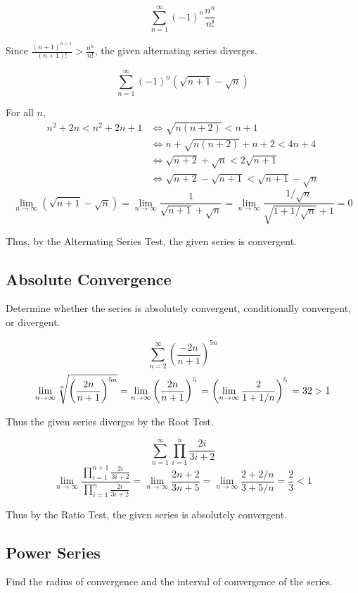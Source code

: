 \documentclass[a4paper,12pt]{article}
\begin{document}
\[\sum_{n=1}^\infty (-1)^n\frac{n^n}{n!}\tag{19}\]

Since $\frac{(n + 1)^{n + 1}}{(n + 1)!} > \frac{n^n}{n!}$, the given
alternating series diverges.

\[\sum_{n=1}^\infty (-1)^n\left(\sqrt{n + 1} - \sqrt n\right)\tag{20}\]

For all $n$,
\begin{align*}
      n^2 + 2n < n^2 + 2n + 1
&\iff \sqrt{n(n + 2)} < n + 1\\
&\iff n + \sqrt{n(n + 2)} + n + 2 < 4n + 4\\
&\iff \sqrt{n + 2} + \sqrt n < 2\sqrt{n + 1}\\
&\iff \sqrt{n + 2} - \sqrt{n + 1} < \sqrt{n + 1} - \sqrt n\tag{i}
\end{align*}
\[\lim_{n\to\infty}\left(\sqrt{n + 1} - \sqrt n\right)
= \lim_{n\to\infty}\frac{1}{\sqrt{n + 1} + \sqrt n}
= \lim_{n\to\infty}\frac{1/\sqrt n}{\sqrt{1 + 1/\sqrt{n}} + 1}
= 0\tag{ii}\]

Thus, by the Alternating Series Test, the given series is convergent.

\subsection{Absolute Convergence}
Determine whether the series is absolutely convergent,
conditionally convergent, or divergent.

\[\sum_{n=2}^\infty\left(\frac{-2n}{n + 1}\right)^{5n}\tag{22}\]
\[\lim_{n\to\infty}\sqrt[n]{\left(\frac{2n}{n + 1}\right)^{5n}}
= \lim_{n\to\infty}\left(\frac{2n}{n + 1}\right)^5\\
= \left(\lim_{n\to\infty}\frac{2}{1 + 1/n}\right)^5\\
= 32 > 1\]

Thus the given series diverges by the Root Test.

\[\sum_{n=1}^\infty\prod_{i=1}^n\frac{2i}{3i + 2}\tag{30}\]
\[\lim_{n\to\infty}\frac{\prod_{i=1}^{n+1}\frac{2i}{3i + 2}}
                        {\prod_{i=1}^n\frac{2i}{3i + 2}}
= \lim_{n\to\infty}\frac{2n + 2}{3n + 5}
= \lim_{n\to\infty}\frac{2 + 2/n}{3 + 5/n}
= \frac{2}{3} < 1\]

Thus by the Ratio Test, the given series is absolutely convergent.

\setcounter{subsection}{7}
\subsection{Power Series}
Find the radius of convergence and the interval of convergence of the series.
\end{document}
